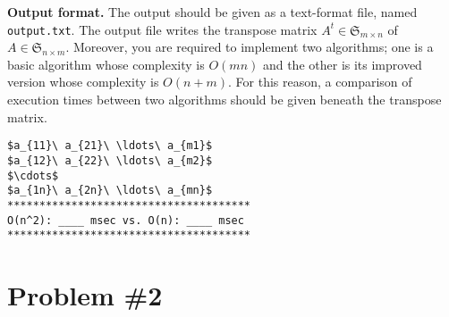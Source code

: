 \documentclass{article}
\newcommand{\sm}[2]{{\mathfrak{S}_{#1\times #2}}}
\begin{document}
\bigskip
\noindent\textbf{Output format.} %
The output should be given as a text-format file, named \texttt{output.txt}.
The output file writes the transpose matrix $A^t\in\sm{m}{n}$ of $A\in\sm{n}{m}$. 
Moreover, you are required to implement two algorithms; one is a basic algorithm whose complexity is $O(mn)$ and 
the other is its improved version whose complexity is $O(n+m)$. 
For this reason, a comparison of execution times between two algorithms should be given beneath the transpose matrix.


\begin{lstlisting}[backgroundcolor=\color{yellow!40}]
$a_{11}\ a_{21}\ \ldots\ a_{m1}$
$a_{12}\ a_{22}\ \ldots\ a_{m2}$
$\cdots$
$a_{1n}\ a_{2n}\ \ldots\ a_{mn}$
**************************************
O(n^2): ____ msec vs. O(n): ____ msec
**************************************
\end{lstlisting}


 
 
\newpage
\section*{Problem \#2}
\end{document}

